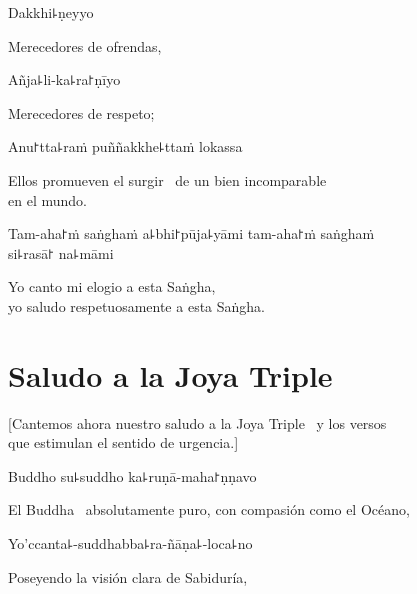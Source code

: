 Dakkhi꜕ṇeyyo

\begin{english}
  Merecedores de ofrendas,
\end{english}

Añja꜕li-ka꜕ra꜓ṇīyo

\begin{english}
  Merecedores de respeto;
\end{english}

Anu꜓tta꜕raṁ puññakkhe꜕ttaṁ lokassa

\begin{english}
  Ellos promueven el surgir \pause\ de un bien incomparable\\ en el mundo.
\end{english}

Tam-aha꜓ṁ saṅghaṁ a꜕bhi꜓pūja꜕yāmi tam-aha꜓ṁ saṅghaṁ\\ si꜕rasā꜓ na꜕māmi

\begin{english}
  Yo canto mi elogio a esta Saṅgha,\\
  yo saludo respetuosamente a esta Saṅgha.
\end{english}

\clearpage

\chapter{Saludo a la Joya Triple}

\begin{leader}
\end{leader}

\begin{english}
  [Cantemos ahora nuestro saludo a la Joya Triple \pause\ y los versos\\ que estimulan el sentido de urgencia.]
\end{english}

Buddho su꜕suddho ka꜕ruṇā-maha꜓ṇṇavo

\begin{english}
  El Buddha \pause\ absolutamente puro, con compasión como el Océano,
\end{english}

Yo'ccanta꜕-suddhabba꜕ra-ñāṇa꜕-loca꜕no

\begin{english}
 Poseyendo la visión clara de Sabiduría,
\end{english}

